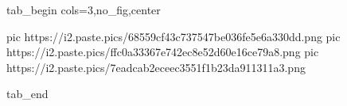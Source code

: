  
 
 
 
 


\ifcmt
  tab_begin cols=3,no_fig,center

     pic https://i2.paste.pics/68559cf43c737547be036fe5e6a330dd.png
		 pic https://i2.paste.pics/ffc0a33367e742ec8e52d60e16ce79a8.png
		 pic https://i2.paste.pics/7eadcab2eceec3551f1b23da911311a3.png

  tab_end
\fi
